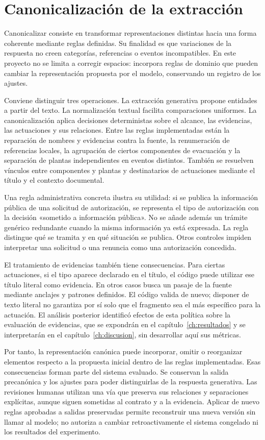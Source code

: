 \section{Canonicalización de la extracción}
\label{sec:canonicalizacion}
Canonicalizar consiste en transformar representaciones distintas hacia una
forma coherente mediante reglas definidas. Su finalidad es que variaciones
de la respuesta no creen categorías, referencias o eventos incompatibles.
En este proyecto no se limita a corregir espacios: incorpora reglas de dominio
que pueden cambiar la representación propuesta por el modelo, conservando
un registro de los ajustes.

Conviene distinguir tres operaciones. La extracción generativa propone
entidades a partir del texto. La normalización textual facilita comparaciones
uniformes. La canonicalización aplica decisiones deterministas sobre el
alcance, las evidencias, las actuaciones y sus relaciones. Entre las reglas
implementadas están la reparación de nombres y evidencias contra la fuente,
la renumeración de referencias locales, la agrupación de ciertos componentes
de evacuación y la separación de plantas independientes en eventos distintos.
También se resuelven vínculos entre componentes y plantas y destinatarios de
actuaciones mediante el título y el contexto documental.

Una regla administrativa concreta ilustra su utilidad: si se publica la
información pública de una solicitud de autorización, se representa el tipo
de autorización con la decisión «sometido a información pública». No se añade
además un trámite genérico redundante cuando la misma información ya está
expresada. La regla distingue qué se tramita y en qué situación se publica.
Otros controles impiden interpretar una solicitud o una renuncia como una
autorización concedida.

El tratamiento de evidencias también tiene consecuencias. Para ciertas
actuaciones, si el tipo aparece declarado en el título, el código puede
utilizar ese título literal como evidencia. En otros casos busca un pasaje de
la fuente mediante anclajes y patrones definidos. El código valida de
nuevo; disponer de texto literal no garantiza por sí solo que el fragmento
sea el más específico para la actuación. El análisis posterior identificó
efectos de esta política sobre la evaluación de evidencias, que se expondrán
en el capítulo~\ref{ch:resultados} y se interpretarán en el
capítulo~\ref{ch:discusion}, sin desarrollar aquí sus métricas.

Por tanto, la representación canónica puede incorporar, omitir o reorganizar
elementos respecto a la propuesta inicial dentro de las reglas implementadas.
Esas consecuencias forman parte del sistema evaluado. Se conservan la salida
precanónica y los ajustes para poder distinguirlas de la respuesta generativa.
Las revisiones humanas utilizan una vía que preserva sus relaciones y
separaciones explícitas, aunque siguen sometidas al contrato y a la evidencia.
Aplicar de nuevo reglas aprobadas a salidas preservadas permite reconstruir
una nueva versión sin llamar al modelo; no autoriza a cambiar retroactivamente
el sistema congelado ni los resultados del experimento.

